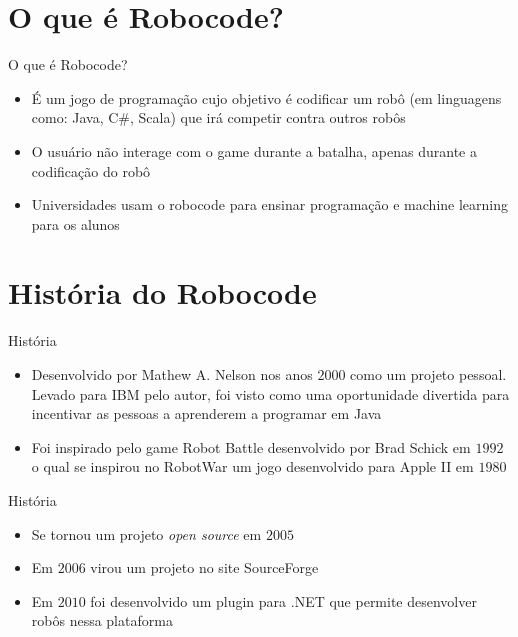 \section{O que é Robocode?}

\begin{frame}
	\begin{block}{O que é Robocode?}
		\begin{itemize}
			\item É um jogo de programação cujo objetivo é codificar um robô (em linguagens como: Java, C\#, Scala) que irá competir contra outros robôs

			\item O usuário não interage com o game durante a batalha, apenas durante a codificação do robô
			
			\item Universidades usam o robocode para ensinar programação e machine learning para os alunos \citep{ROBOWIKI}
			
		\end{itemize}
	\end{block}
\end{frame}


\section{História do Robocode}

\begin{frame}
	\begin{block}{História}
		\begin{itemize}
			\item Desenvolvido por Mathew A. Nelson nos anos $2000$ como um projeto pessoal. Levado para IBM pelo autor, foi visto como uma oportunidade divertida para incentivar as pessoas a aprenderem a programar em Java

			\item Foi inspirado pelo game Robot Battle desenvolvido por Brad Schick em $1992$ o qual se inspirou no RobotWar um jogo desenvolvido para Apple II em $1980$
			
		\end{itemize}
	\end{block}
\end{frame}


\begin{frame}
	\begin{block}{História}
		\begin{itemize}
		
			\item Se tornou um projeto \emph{open source} em $2005$
			
			\item Em $2006$ virou um projeto no site SourceForge

			\item Em $2010$ foi desenvolvido um plugin para .NET que permite desenvolver robôs nessa plataforma \citep{readmeRobo}
						
		\end{itemize}
	\end{block}
\end{frame}

